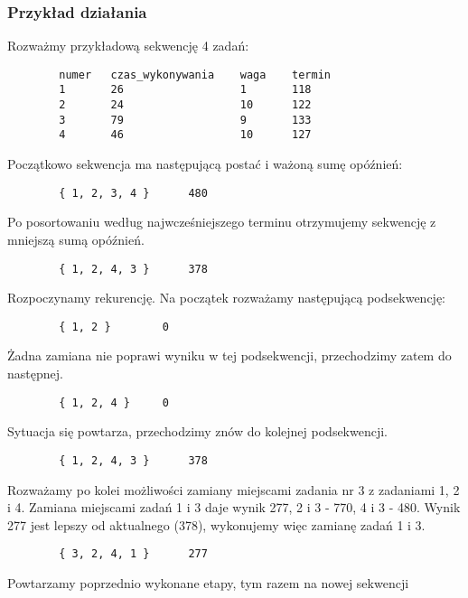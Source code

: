 \documentclass[polish,polish,a4paper]{article}
\begin{document}
	\subsubsection{Przykład działania}
	\lstset{style=shortStyle}
	
	Rozważmy przykładową sekwencję 4 zadań:
	
	\begin{lstlisting}
		numer	czas_wykonywania	waga	termin
		1		26					1		118
		2		24					10		122
		3		79					9		133
		4		46					10		127
	\end{lstlisting}
	
	Początkowo sekwencja ma następującą postać i ważoną sumę opóźnień:
	
	\begin{lstlisting}
		{ 1, 2, 3, 4 }		480
	\end{lstlisting}
	
	Po posortowaniu według najwcześniejszego terminu otrzymujemy sekwencję z mniejszą sumą opóźnień.
	
	\begin{lstlisting}
		{ 1, 2, 4, 3 }		378
	\end{lstlisting}
	
	Rozpoczynamy rekurencję. Na początek rozważamy następującą podsekwencję:
	
	\begin{lstlisting}
		{ 1, 2 }		0
	\end{lstlisting}
	
	Żadna zamiana nie poprawi wyniku w tej podsekwencji, przechodzimy zatem do następnej.
	
	\begin{lstlisting}
		{ 1, 2, 4 }		0
	\end{lstlisting}
	
	Sytuacja się powtarza, przechodzimy znów do kolejnej podsekwencji.
	
	\begin{lstlisting}
		{ 1, 2, 4, 3 }		378
	\end{lstlisting}
	
	Rozważamy po kolei możliwości zamiany miejscami zadania nr 3 z zadaniami 1, 2 i 4. Zamiana miejscami zadań 1 i 3 daje wynik 277, 2 i 3 - 770, 4 i 3 - 480. Wynik 277 jest lepszy od aktualnego (378), wykonujemy więc zamianę zadań 1 i 3.
	
	\begin{lstlisting}
		{ 3, 2, 4, 1 }		277
	\end{lstlisting}
	
	Powtarzamy poprzednio wykonane etapy, tym razem na nowej sekwencji
	
\end{document}

